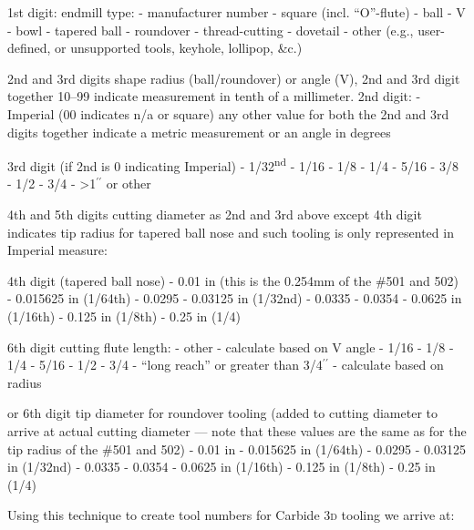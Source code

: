 \documentclass{ltxdoc}
\begin{document}
\begin{outline}
\1 1st digit: endmill type:
 - manufacturer number 
 - square (incl. ``O''-flute)
 - ball
 - V
 - bowl
 - tapered ball
 - roundover
 - thread-cutting
 - dovetail
 - other (e.g., user-defined, or unsupported tools, keyhole, lollipop, \&c.)

\1 2nd and 3rd digits shape radius (ball/roundover) or angle (V), 2nd and 3rd digit together 10--99 indicate measurement in tenth of a millimeter. 2nd digit:
 - Imperial (00 indicates n/a or square) 
\2 any other value for both the 2nd and 3rd digits together indicate a metric measurement or an angle in degrees

\1 3rd digit (if 2nd is 0 indicating Imperial)
 - 1/32\textsuperscript{nd}
 - 1/16
 - 1/8
 - 1/4
 - 5/16
 - 3/8
 - 1/2
 - 3/4
 - >1$^{\prime\prime}$ or other

\1 4th and 5th digits cutting diameter as 2nd and 3rd above except 4th digit indicates tip radius for tapered ball nose and such tooling is only represented in Imperial measure:

\1 4th digit (tapered ball nose)
 - 0.01 in (this is the 0.254mm of the \#501 and 502)
 - 0.015625 in (1/64th)
 - 0.0295
 - 0.03125 in (1/32nd)
 - 0.0335
 - 0.0354
 - 0.0625 in (1/16th)
 - 0.125 in (1/8th)
 - 0.25 in (1/4)

\1 6th digit cutting flute length:
 - other
 - calculate based on V angle
 - 1/16
 - 1/8
 - 1/4
 - 5/16
 - 1/2
  - 3/4
 - ``long reach'' or greater than 3/4$^{\prime\prime}$
 - calculate based on radius

\1 or 6th digit tip diameter for roundover tooling (added to cutting diameter to arrive at actual cutting diameter --- note that these values are the same as for the tip radius of the \#501 and 502)
 - 0.01 in 
 - 0.015625 in (1/64th)
 - 0.0295
 - 0.03125 in (1/32nd)
 - 0.0335
 - 0.0354
 - 0.0625 in (1/16th)
 - 0.125 in (1/8th)
 - 0.25 in (1/4)

\end{outline}

Using this technique to create tool numbers for Carbide \textsc{3d} tooling we arrive at:
\end{document}
